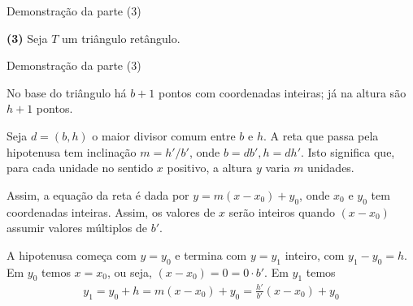 \begin{frame}[fragile]{Demonstração da parte (3)}

    \textbf{(3)} Seja $T$ um triângulo retângulo.

    \begin{figure}
        \centering

    \end{figure}

\end{frame}


\begin{frame}[fragile]{Demonstração da parte (3)}

    No base do triângulo há $b + 1$ pontos com coordenadas inteiras; já na altura são
    $h + 1$ pontos. 
        \pause

    Seja $d = (b, h)$ o maior divisor comum entre $b$ e $h$. A reta que passa pela hipotenusa
    tem inclinação $m = h'/b'$, onde $b = db', h = dh'$. Isto significa que, para cada unidade
    no sentido $x$ positivo, a altura $y$ varia $m$ unidades.
        \pause

    Assim, a equação da reta é dada por $y = m(x - x_0) + y_0$, onde $x_0$ e $y_0$ tem coordenadas 
    inteiras. Assim, os valores de $x$ serão inteiros quando $(x - x_0)$ assumir valores múltiplos 
    de $b'$.
        \pause
        
    A hipotenusa começa com $y = y_0$ e termina com $y = y_1$ inteiro, com $y_1 - y_0 = h$.
    Em $y_0$ temos $x = x_0$, ou seja, $(x - x_0) = 0 = 0\cdot b'$. Em $y_1$ temos
    \begin{align*}
       y_1 = y_0 + h = m(x - x_0) + y_0 = \frac{h'}{b'}(x - x_0) + y_0
    \end{align*}
             
\end{frame}


